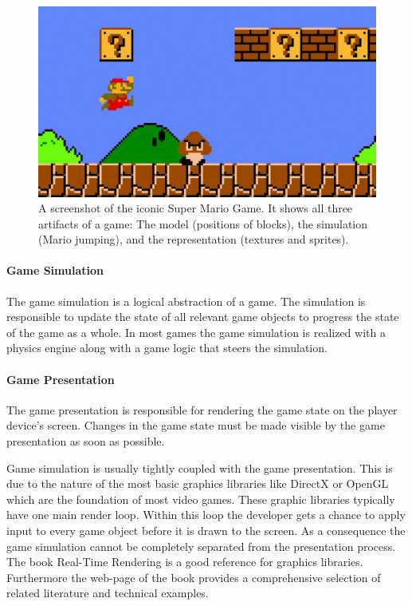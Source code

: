 \begin{figure}[H]
	\centering
	\includegraphics[width=\textwidth]{images/super_mario}
	\caption{A screenshot of the iconic Super Mario Game. It shows all three
	artifacts of a game: The model (positions of blocks), the simulation (Mario
	jumping), and the representation (textures and \glspl{sprite}).}
	\label{fig:super_mario}
\end{figure}

\paragraph{Game Simulation}

The game simulation is a logical abstraction of a game. The simulation is
responsible to update the state of all relevant game objects to progress the
state of the game as a whole. In most games the game simulation is realized with
a physics engine along with a game logic that steers the simulation.

\paragraph{Game Presentation}

The game presentation is responsible for rendering the game state on the player
device's screen. Changes in the game state must be made visible by the game
presentation as soon as possible.

Game simulation is usually tightly coupled with the game presentation. This is
due to the nature of the most basic graphics libraries like DirectX or OpenGL
which are the foundation of most video games. These graphic libraries typically
have one main render loop. Within this loop the developer gets a chance to apply
input to every game object before it is drawn to the screen. As a consequence
the game simulation cannot be completely separated from the presentation
process. The book Real-Time Rendering \cite{RTR3} is a good reference for
graphics libraries. Furthermore the web-page of the book provides a
comprehensive selection of related literature and technical examples.

